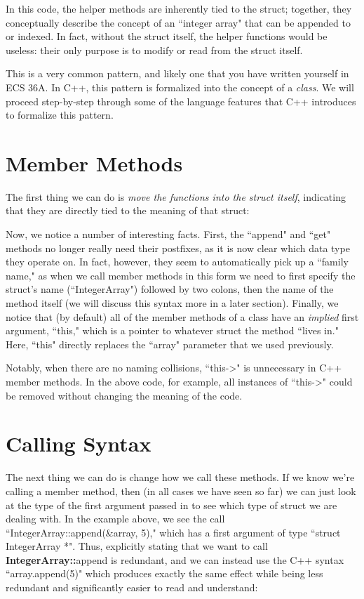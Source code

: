 

In this code, the helper methods are inherently tied to the struct; together,
they conceptually describe the concept of an ``integer array" that can be
appended to or indexed. In fact, without the struct itself, the helper
functions would be useless: their only purpose is to modify or read from the
struct itself.

This is a very common pattern, and likely one that you have written yourself in
ECS 36A. In C++, this pattern is formalized into the concept of a
\textit{class}. We will proceed step-by-step through some of the language
features that C++ introduces to formalize this pattern.

\section{Member Methods}

The first thing we can do is \textit{move the functions into the struct
itself}, indicating that they are directly tied to the meaning of that struct:



Now, we notice a number of interesting facts. First, the ``append" and ``get"
methods no longer really need their postfixes, as it is now clear which data
type they operate on. In fact, however, they seem to automatically pick up a
``family name," as when we call member methods in this form we need to first
specify the struct's name (``IntegerArray") followed by two colons, then the
name of the method itself (we will discuss this syntax more in a later
section). Finally, we notice that (by default) all of the member methods of a
class have an \textit{implied} first argument, ``this," which is a pointer to
whatever struct the method ``lives in." Here, ``this" directly replaces the
``array" parameter that we used previously.

Notably, when there are no naming collisions, ``this->" is unnecessary in C++
member methods. In the above code, for example, all instances of ``this->"
could be removed without changing the meaning of the code.

\section{Calling Syntax}

The next thing we can do is change how we call these methods. If we know we're
calling a member method, then (in all cases we have seen so far) we can just
look at the type of the first argument passed in to see which type of struct we
are dealing with. In the example above, we see the call
``IntegerArray::append(\&array, 5)," which has a first argument of type ``struct
IntegerArray *". Thus, explicitly stating that we want to call
\textbf{IntegerArray::}append is redundant, and we can instead use the C++
syntax ``array.append(5)" which produces exactly the same effect while being
less redundant and significantly easier to read and understand:

